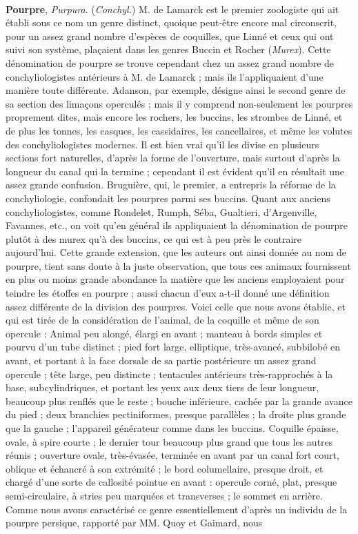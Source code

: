 \documentclass[a4paper, 11pt, oneside, polutonikogreek, french]{article}
\begin{document}
\paragraph{}
\textbf{Pourpre}, \emph{Purpura}. (\emph{Conchyl.}) M. de Lamarck est le premier zoologiste qui ait établi sous ce nom un genre distinct, quoique peut-être encore mal circonscrit, pour un assez grand nombre d'espèces de coquilles, que Linné et ceux qui ont suivi son système, plaçaient dans les genres Buccin et Rocher (\emph{Murex}). Cette dénomination de pourpre se trouve cependant chez un assez grand nombre de conchyliologistes antérieurs à M. de Lamarck ; mais ils l'appliquaient d'une manière toute différente. Adanson, par exemple, désigne ainsi le second genre de sa section des limaçons operculés ; mais il y comprend non-seulement les pourpres proprement dites, mais encore les rochers, les buccins, les strombes de Linné, et de plus les tonnes, les casques, les cassidaires, les cancellaires, et même les volutes des conchyliologistes modernes. Il est bien vrai qu'il les divise en plusieurs sections fort naturelles, d'après la forme de l'ouverture, mais surtout d'après la longueur du canal qui la termine ; cependant il est évident qu'il en résultait une assez grande confusion. Bruguière, qui, le premier, a entrepris la réforme de la conchyliologie, confondait les pourpres parmi ses buccins. Quant aux anciens conchyliologistes, comme Rondelet, Rumph, Séba, Gualtieri, d'Argenville, Favannes, etc., on voit qu'en général ils appliquaient la dénomination de pourpre plutôt à des murex qu'à des buccins, ce qui est à peu près le contraire aujourd'hui. Cette grande extension, que les auteurs ont ainsi donnée au nom de pourpre, tient sans doute à la juste observation, que tous ces animaux fournissent en plus ou moins grande abondance la matière que les anciens employaient pour teindre les étoffes en pourpre ; aussi chacun d'eux a-t-il donné une définition assez différente de la division des pourpres. Voici celle que nous avons établie, et qui est tirée de la considération de l'animal, de la coquille et même de son opercule : Animal peu alongé, élargi en avant ; manteau à bords simples et pourvu d'un tube distinct ; pied fort large, elliptique, très-avancé, subbilobé en avant, et portant à la face dorsale de sa partie postérieure un assez grand opercule ; tête large, peu distincte ; tentacules antérieurs très-rapprochés à la base, subcylindriques, et portant les yeux aux deux tiers de leur longueur, beaucoup plus renflés que le reste ; bouche inférieure, cachée par la grande avance du pied ; deux branchies pectiniformes, presque parallèles ; la droite plus grande que la gauche ; l'appareil générateur comme dans les buccins. Coquille épaisse, ovale, à spire courte ; le dernier tour beaucoup plus grand que tous les autres réunis ; ouverture ovale, très-évasée, terminée en avant par un canal fort court, oblique et échancré à son extrémité ; le bord columellaire, presque droit, et chargé d'une sorte de callosité pointue en avant : opercule corné, plat, presque semi-circulaire, à stries peu marquées et transverses ; le sommet en arrière. Comme nous avons caractérisé ce genre essentiellement d'après un individu de la pourpre persique, rapporté par MM. Quoy et Gaimard, nous 
\end{document}
